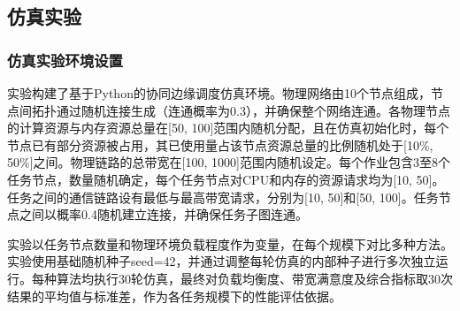 \subsection{仿真实验}
\subsubsection{仿真实验环境设置}
实验构建了基于Python的协同边缘调度仿真环境。物理网络由10个节点组成，节点间拓扑通过随机连接生成（连通概率为0.3），并确保整个网络连通。各物理节点的计算资源与内存资源总量在[50, 100]范围内随机分配，且在仿真初始化时，每个节点已有部分资源被占用，其已使用量占该节点资源总量的比例随机处于[10\%, 50\%]之间。物理链路的总带宽在[100, 1000]范围内随机设定。每个作业包含3至8个任务节点，数量随机确定，每个任务节点对CPU和内存的资源请求均为[10, 50]。任务之间的通信链路设有最低与最高带宽请求，分别为[10, 50]和[50, 100]。任务节点之间以概率0.4随机建立连接，并确保任务子图连通。

实验以任务节点数量和物理环境负载程度作为变量，在每个规模下对比多种方法。实验使用基础随机种子seed=42，并通过调整每轮仿真的内部种子进行多次独立运行。每种算法均执行30轮仿真，最终对负载均衡度、带宽满意度及综合指标取30次结果的平均值与标准差，作为各任务规模下的性能评估依据。

